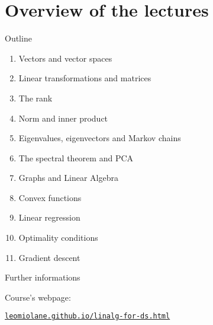 \documentclass{beamer}
\begin{document}
\section{Overview of the lectures}
\begin{frame}{Outline}
	\begin{enumerate}
		\item Vectors and vector spaces
		\item Linear transformations and matrices
		\item The rank
		\item Norm and inner product
		\item Eigenvalues, eigenvectors and Markov chains
		\item The spectral theorem and PCA
		\item Graphs and Linear Algebra
		\item Convex functions
		\item Linear regression
		\item Optimality conditions
		\item Gradient descent
	\end{enumerate}
\end{frame}

\begin{frame}{Further informations}


	Course's webpage:
	\vspace{0.3cm}
	\begin{center}
		\href{https://leomiolane.github.io/linalg-for-ds.html}{\large \texttt{leomiolane.github.io/linalg-for-ds.html}}
	\end{center}

\end{frame}
\end{document}
